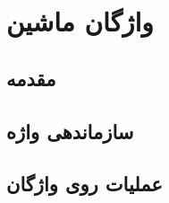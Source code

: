 \chapter{ واژگان ماشین}\label{chapter6}



\section{مقدمه}



\section{سازماندهی واژه}




\section{عملیات روی واژگان}
